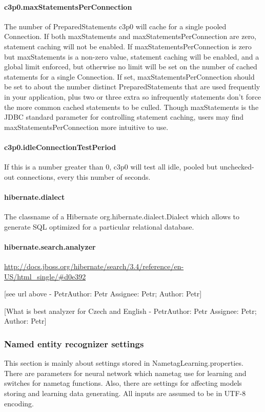 \documentclass[12pt,a4paper]{report}
\makeatletter
\newcommand{\comment}[3][\@empty]{
  {\color{magenta}[#3 - }
  {\color{green}\ifx\@empty#1\relax Author: #2 \else Assignee: #1; Author: #2\fi}{\color{magenta}]}
}
\makeatother
\begin{document}
\paragraph{c3p0.maxStatementsPerConnection}
The number of PreparedStatements c3p0 will cache for a single pooled Connection.
If both maxStatements and maxStatementsPerConnection are zero, statement caching
will not be enabled. If maxStatementsPerConnection is zero but maxStatements is
a non-zero value, statement caching will be enabled, and a global limit enforced,
but otherwise no limit will be set on the number of cached statements for a single
Connection. If set, maxStatementsPerConnection should be set to about the number
distinct PreparedStatements that are used frequently in your application, plus
two or three extra so infrequently statements don't force the more common cached
statements to be culled. Though maxStatements is the JDBC standard parameter for
controlling statement caching, users may find maxStatementsPerConnection more
intuitive to use.

\paragraph{c3p0.idleConnectionTestPeriod}
If this is a number greater than 0, c3p0 will test all idle, pooled but unchecked-out
connections, every this number of seconds.

\paragraph{hibernate.dialect}
The classname of a Hibernate org.hibernate.dialect.Dialect which allows to generate
SQL optimized for a particular relational database.

\paragraph{hibernate.search.analyzer}
\url{http://docs.jboss.org/hibernate/search/3.4/reference/en-US/html_single/#d0e392}
\comment[Petr]{Petr}{see url above}
\comment[Petr]{Petr}{What is best analyzer for Czech and English}

\subsubsection{Named entity recognizer settings}
This section is mainly about settings stored in NametagLearning.properties.
There are parameters for neural network which nametag use for learning and switches for nametag functions.
Also, there are settings for affecting models storing and learning data generating.
All inputs are assumed to be in UTF-8 encoding.
\end{document}
